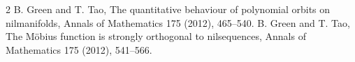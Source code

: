 \documentclass{article}
\theoremstyle{remark}
\begin{document}



\begin{thebibliography}{2}
 B. Green and T. Tao, The quantitative behaviour of polynomial orbits on nilmanifolds, Annals of Mathematics 175 (2012), 465--540.
 B. Green and T. Tao, The M\"obius function is strongly orthogonal to nilsequences, Annals of Mathematics 175 (2012), 541--566.
\end{thebibliography}
\end{document}
